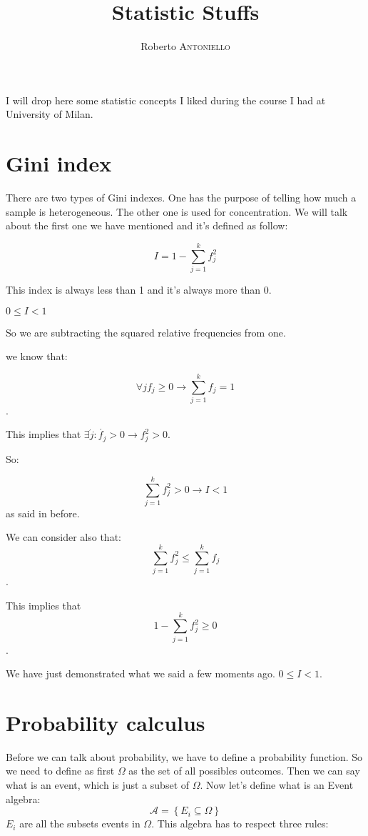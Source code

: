 \documentclass{article}
\title{Statistic Stuffs}
\author{Roberto \textsc{Antoniello}}
\begin{document}
\maketitle

\begin{center} I will drop here some statistic concepts I liked during the course I had at University of Milan.\end{center}

\section{Gini index}

There are two types of Gini indexes. One has the purpose of telling how much a sample is heterogeneous. The other one is used for concentration. We will talk about the first one we have mentioned and it's defined as follow:
\begin{center}$$I = 1 - \sum_{j=1}^{k}f_j^2$$\end{center}

This index is always less than 1 and it's always more than 0.

\begin{center}$0 \leq I < 1$\end{center}

So we are subtracting the squared relative frequencies from one. 

we know that: 
\begin{center}$$\forall j f_j \ge 0 \longrightarrow \sum_{j=1}^k f_j = 1$$.\end{center}

This implies that $\exists \acute{j} : \acute{f_j} > 0 \longrightarrow f_j^2 > 0$.

So: \begin{center}$$\sum_{j=1}^k f_j^2 > 0 \longrightarrow I < 1$$ as said in before.\end{center}

We can consider also that: $$\sum_{j=1}^kf_j^2 \le \sum_{j=1}^kf_j$$.

This implies that $$1 - \sum_{j=1}^kf_j^2 \ge 0$$.

We have just demonstrated what we said a few moments ago. $0 \leq I < 1$.  

\section{Probability calculus}

Before we can talk about probability, we have to define a probability function. So we need to define as first $\Omega$ as the set of all possibles outcomes. Then we can say what is an event, which is just a subset of $\Omega$. Now let's define what is an Event algebra:
$$\mathcal{A} = \left\{E_i \subseteq \Omega\right\}$$
$E_i$ are all the subsets events in $\Omega$. This algebra has to respect three rules:
\end{document}
